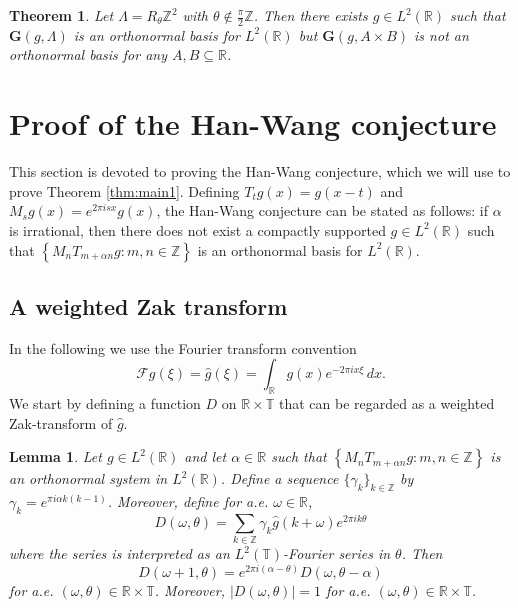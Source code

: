 \documentclass[reqno,a4paper,12pt]{amsart}
\numberwithin{equation}{section}
\newtheorem{theorem}[definition]{Theorem}
\newtheorem{lemma}[definition]{Lemma}
\def\Z{{\mathbb Z}}
\def\R{{\mathbb R}}
\def\T{{\mathbb T}}
\newcommand{\lt}{{L^2(\R)}}
\newcommand{\ft}{{\mathcal{F}}}
\newcommand\1{\mathds{1}}
\begin{document}
\begin{theorem}\label{thm:main3}
    Let $\Lambda = R_{\theta}\Z^2$ with $\theta \not \in \frac \pi2 \Z$. Then there exists $g \in \lt$ such that $\mathbf{G}(g,\Lambda)$ is an orthonormal basis for $\lt$ but $\mathbf{G}(g,A \times B)$ is not an orthonormal basis for any $A,B \subseteq \R$.
\end{theorem}


\section{Proof of the Han-Wang conjecture}

This section is devoted to proving the Han-Wang conjecture, which we will use to prove Theorem \ref{thm:main1}. Defining $T_tg(x)=g(x-t)$ and $M_sg(x)=e^{2\pi i s x} g(x)$, the Han-Wang conjecture can be stated as follows: if $\alpha$ is irrational, then there does not exist a compactly supported $g \in \lt$ such that $\left\{M_nT_{m+\alpha n}g:m,n\in\mathbb Z\right\}$ is an orthonormal basis for $\lt$.

\subsection{A weighted Zak transform}

In the following we use the Fourier transform convention
$$
\ft g(\xi) = \widehat{g}(\xi) = \int_\R g(x) e^{-2\pi i x \xi} \, dx. 
$$
We start by defining a function $D$ on $\R \times \T$ that can be regarded as a weighted Zak-transform of $\widehat g$.

\begin{lemma}\label{lem:direct-fibre-form}
Let $g \in \lt$ and let $\alpha \in \R$ such that $\left\{M_nT_{m+\alpha n}g:m,n\in\mathbb Z\right\}$ is an orthonormal system in $L^2(\R)$. Define a sequence $\{ \gamma_k \}_{k \in \Z}$ by $\gamma_k=e^{\pi i\alpha k(k-1)}$. Moreover, define for a.e. $\omega\in\mathbb R$,
$$
D(\omega,\theta) = \sum_{k\in\mathbb Z} \gamma_k\widehat g(k+\omega)e^{2\pi i k\theta}
$$
where the series is interpreted as an $L^2(\T)$-Fourier series in $\theta$. Then 
\begin{equation}\label{eq:direct-fibre-covariance}
D(\omega+1,\theta) = e^{2\pi i(\alpha-\theta)}D(\omega,\theta-\alpha)
\end{equation}
for a.e. $(\omega,\theta) \in \R \times \T$.
Moreover, $|D(\omega,\theta)|=1$ for a.e. $(\omega,\theta)\in\mathbb R\times\T$.
\end{lemma}
\end{document}
